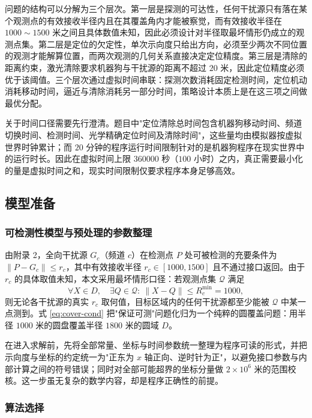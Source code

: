 \documentclass[12pt,a4paper]{ctexart}
\begin{document}
问题的结构可以分解为三个层次。第一层是探测的可达性，任何干扰源只有落在某个观测点的有效接收半径内且在其覆盖角内才能被察觉，而有效接收半径在 $1000\sim1500$ 米之间且具体数值未知，因此必须设计对半径取最坏情形仍成立的观测点集。第二层是定位的欠定性，单次示向度只给出方向，必须至少两次不同位置的观测才能解算位置，而两次观测的几何关系直接决定定位精度。第三层是清除的距离约束，激光清除要求机器狗与干扰源的距离不超过 $20$ 米，因此定位精度必须优于该阈值。三个层次通过虚拟时间串联：探测次数消耗固定检测时间，定位机动消耗移动时间，逼近与清除消耗另一部分时间，策略设计本质上是在这三项之间做最优分配。

关于时间口径需要先行澄清。题目中"定位清除总时间包含机器狗移动时间、频道切换时间、检测时间、光学精确定位时间及清除时间"，这些量均由模拟器按虚拟世界时钟累计；而 $20$ 分钟的程序运行时间限制针对的是机器狗程序在现实世界中的运行时长。因此在虚拟时间上限 $360000$ 秒（$100$ 小时）之内，真正需要最小化的量是虚拟时间之和，现实时间限制仅要求程序本身足够高效。

\subsection{模型准备}

\subsubsection{可检测性模型与预处理的参数整理}

由附录 2，全向干扰源 $G_c$（频道 $c$）在检测点 $P$ 处可被检测的充要条件为 $\lVert P-G_c\rVert\le r_c$，其中有效接收半径 $r_c\in[1000,1500]$ 且不通过接口返回。由于 $r_c$ 的具体取值未知，本文采用最坏情形口径：若观测点集 $\mathcal Q$ 满足
\begin{equation}
\forall X\in D,\quad \exists Q\in\mathcal Q:\ \lVert X-Q\rVert\le R_c^{\min}=1000,
\label{eq:cover-cond}
\end{equation}
则无论各干扰源的真实 $r_c$ 取何值，目标区域内的任何干扰源都至少能被 $\mathcal Q$ 中某一点测到。式 \eqref{eq:cover-cond} 把"保证可测"问题化归为一个纯粹的圆覆盖问题：用半径 $1000$ 米的圆盘覆盖半径 $1800$ 米的圆域 $D$。

在进入求解前，先将全部常量、坐标与时间参数统一整理为程序可读的形式，并把示向度与坐标的约定统一为"正东为 $x$ 轴正向、逆时针为正"，以避免接口参数与内部计算之间的符号错误；同时对全部可能超界的坐标分量做 $2\times10^6$ 米的范围校核。这一步虽无复杂的数学内容，却是程序正确性的前提。

\subsubsection{算法选择}
\end{document}
